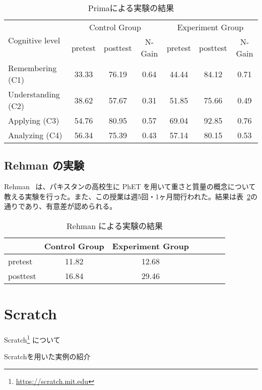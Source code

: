 \begin{table}[htb]
\centering
\begin{tabular}{lcccccc}
  \toprule
  \multirow{2}{*}{Cognitive level} & \multicolumn{3}{c}{Control Group} & \multicolumn{3}{c}{Experiment Group}\\
  \cmidrule(lr){2-4} \cmidrule(lr){5-7}
  & pretest & posttest & N-Gain & pretest & posttest & N-Gain\\
  \midrule
  Remembering (C1) & 33.33 & 76.19 & 0.64 & 44.44 & 84.12 & 0.71\\
  Understanding (C2) & 38.62 & 57.67 & 0.31 & 51.85 & 75.66 & 0.49\\
  Applying (C3) & 54.76 & 80.95 & 0.57 & 69.04 & 92.85 & 0.76\\
  Analyzing (C4) & 56.34 & 75.39 & 0.43 & 57.14 & 80.15 & 0.53\\
  \bottomrule
\end{tabular}

\caption{Primaによる実験の結果}
\label{prima_table}
\end{table}

\clearpage
\subsection*{Rehman の実験}
Rehman~\cite{rehman_teaching_2021} は、パキスタンの高校生に PhET を用いて重さと質量の概念について教える実験を行った。また、この授業は週5回・1ヶ月間行われた。結果は表~\ref{rehman_result}の通りであり、有意差が認められる。

\begin{table}[htb]
\centering
\begin{tabular}{lcccccc}
\toprule
& Control Group & Experiment Group \\
\midrule
pretest & 11.82 & 12.68 \\
posttest & 16.84 & 29.46 \\
\bottomrule
\end{tabular}
\caption{Rehman による実験の結果} \label{rehman_result}
\end{table}

\section{Scratch}

Scratch\footnote{\url{https://scratch.mit.edu}} について

Scratchを用いた実例の紹介
~\cite{Lpez2015ScratchAA}


